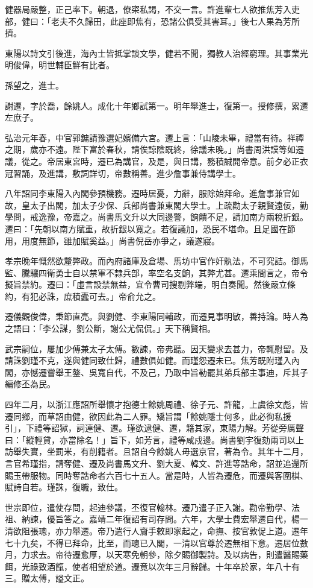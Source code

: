 \begin{pinyinscope}
健器局嚴整，正己率下。朝退，僚寀私謁，不交一言。許進輩七人欲推焦芳入吏部，健曰：「老夫不久歸田，此座即焦有，恐諸公俱受其害耳。」後七人果為芳所擠。

東陽以詩文引後進，海內士皆抵掌談文學，健若不聞，獨教人治經窮理。其事業光明俊偉，明世輔臣鮮有比者。

孫望之，進士。

謝遷，字於喬，餘姚人。成化十年鄉試第一。明年舉進士，復第一。授修撰，累遷左庶子。

弘治元年春，中官郭鏞請豫選妃嬪備六宮。遷上言：「山陵未畢，禮當有待。祥禫之期，歲亦不遠。陛下富於春秋，請俟諒陰既終，徐議未晚。」尚書周洪謨等如遷議，從之。帝居東宮時，遷已為講官，及是，與日講，務積誠開帝意。前夕必正衣冠習誦，及進講，敷詞詳切，帝數稱善。進少詹事兼侍講學士。

八年詔同李東陽入內閣參預機務。遷時居憂，力辭，服除始拜命。進詹事兼官如故，皇太子出閣，加太子少保、兵部尚書兼東閣大學士。上疏勸太子親賢遠佞，勤學問，戒逸豫，帝嘉之。尚書馬文升以大同邊警，餉饋不足，請加南方兩稅折銀。遷曰：「先朝以南方賦重，故折銀以寬之。若復議加，恐民不堪命。且足國在節用，用度無節，雖加賦奚益。」尚書倪岳亦爭之，議遂寢。

孝宗晚年慨然欲釐弊政。而內府諸庫及倉場、馬坊中官作奸骫法，不可究詰。御馬監、騰驤四衛勇士自以禁軍不隸兵部，率空名支餉，其弊尤甚。遷乘間言之，帝令擬旨禁約。遷曰：「虛言設禁無益，宜令曹司搜剔弊端，明白奏聞。然後嚴立條約，有犯必誅，庶積蠹可去。」帝俞允之。

遷儀觀俊偉，秉節直亮。與劉健、李東陽同輔政，而遷見事明敏，善持論。時人為之語曰：「李公謀，劉公斷，謝公尤侃侃。」天下稱賢相。

武宗嗣位，屢加少傅兼太子太傅。數諫，帝弗聽。因天變求去甚力，帝輒慰留。及請誅劉瑾不克，遂與健同致仕歸，禮數俱如健。而瑾怨遷未已。焦芳既附瑾入內閣，亦憾遷嘗舉王鏊、吳寬自代，不及己，乃取中旨勒罷其弟兵部主事迪，斥其子編修丕為民。

四年二月，以浙江應詔所舉懷才抱德士餘姚周禮、徐子元、許龍，上虞徐文彪，皆遷同鄉，而草詔由健，欲因此為二人罪。矯旨謂「餘姚隱士何多，此必徇私援引」，下禮等詔獄，詞連健、遷。瑾欲逮健、遷，籍其家，東陽力解。芳從旁厲聲曰：「縱輕貸，亦當除名！」旨下，如芳言，禮等咸戍邊。尚書劉宇復劾兩司以上訪舉失實，坐罰米，有削籍者。且詔自今餘姚人毋選京官，著為令。其年十二月，言官希瑾指，請奪健、遷及尚書馬文升、劉大夏、韓文、許進等誥命，詔並追還所賜玉帶服物。同時奪誥命者六百七十五人。當是時，人皆為遷危，而遷與客圍棋、賦詩自若。瑾誅，復職，致仕。

世宗即位，遣使存問，起迪參議，丕復官翰林。遷乃遣子正入謝。勸帝勤學、法祖、納諫，優旨答之。嘉靖二年復詔有司存問。六年，大學士費宏舉遷自代，楊一清欲阻張璁，亦力舉遷。帝乃遣行人齎手敕即家起之，命撫、按官敦促上道。遷年七十九矣，不得已拜命，比至，而璁已入閣，一清以官尊於遷無相下意。遷居位數月，力求去。帝待遷愈厚，以天寒免朝參，除夕賜御製詩。及以病告，則遣醫賜藥餌，光祿致酒餼，使者相望於道。遷竟以次年三月辭歸。十年卒於家，年八十有三。贈太傅，謚文正。


\end{pinyinscope}
